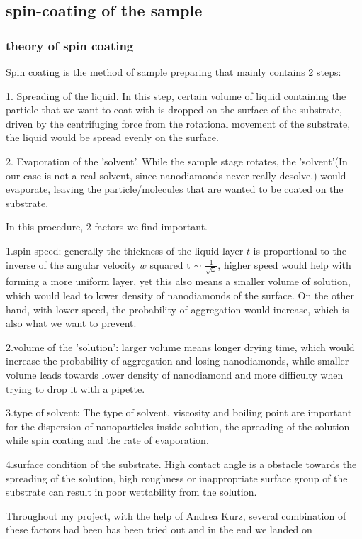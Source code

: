 \subsection{spin-coating of the sample}
\subsubsection{theory of spin coating} 
Spin coating is the method of sample preparing that mainly contains 2 steps:

1. Spreading of the liquid. In this step, certain volume of liquid containing the particle that we want to coat with is dropped on the surface of the substrate, driven by the centrifuging force from the rotational movement of the substrate, the liquid would be spread evenly on the surface.

2. Evaporation of the 'solvent'. While the sample stage rotates, the 'solvent'(In our case is not a real solvent, since nanodiamonds never really desolve.) would evaporate, leaving the particle/molecules that are wanted to be coated on the substrate.

In this procedure, 2 factors we find important.

1.spin speed: generally the thickness of the liquid layer $t$ is proportional to the inverse of the angular velocity $w$ squared t $\sim$ $\frac{1}{\sqrt{\omega}}$, higher speed would help with forming a more uniform layer, yet this also means a smaller volume of solution, which would lead to lower density of nanodiamonds of the surface. On the other hand, with lower speed, the probability of aggregation would increase, which is also what we want to prevent.

2.volume of the 'solution': larger volume means longer drying time, which would increase the probability of aggregation and losing nanodiamonds, while smaller volume leads towards lower density of nanodiamond and more difficulty when trying to drop it with a pipette. 

3.type of solvent: The type of solvent, viscosity and boiling point are important for the dispersion of nanoparticles inside solution, the spreading of the solution while spin coating and the rate of evaporation.

4.surface condition of the substrate. High contact angle is a obstacle towards the spreading of the solution, high roughness or inappropriate surface group of the substrate can result in poor wettability from the solution.

Throughout my project, with the help of Andrea Kurz, several combination of these factors had been has been tried out and in the end we landed on 

